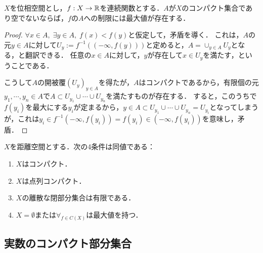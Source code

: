 \documentclass[uplatex,dvipdfmx]{jsreport}
\begin{document}
\begin{proposition}\label{prop-maximum-value-theorem}
    $X$を位相空間とし，$f:X\to\mathbb{R}$を連続関数とする．$A$が$X$のコンパクト集合であり空でないならば，$f$の$A$への制限には最大値が存在する．
\end{proposition}
\begin{proof}
    $\forall x\in A,\;\exists y\in A,\; f(x)<f(y)$と仮定して，矛盾を導く．
    これは，$A$の元$y\in A$に対して$U_y:=f^{-1}((-\infty,f(y)))$と定めると，$A=\cup_{y\in A}U_y$となる，と翻訳できる．
    任意の$x\in A$に対して，$y$が存在して$x\in U_y$を満たす，ということである．

    こうして$A$の開被覆$(U_y)_{y\in A}$を得たが，$A$はコンパクトであるから，有限個の元$y_1,\cdots,y_n\in A$で$A\subset U_{y_1}\cup\cdots\cup U_{y_n}$を満たすものが存在する．
    すると，このうちで$f(y_i)$を最大にする$y_i$が定まるから，$y\in A\subset U_{y_1}\cup\cdots\cup U_{y_n}=U_{y_i}$となってしまうが，これは$y_i\in f^{-1}(-\infty,f(y_i))=f(y_i)\in(-\infty,f(y_i))$を意味し，矛盾．
\end{proof}

\begin{proposition}
    $X$を距離空間とする．次の4条件は同値である：
    \begin{enumerate}
        \item $X$はコンパクト．
        \item $X$は点列コンパクト．
        \item $X$の離散な閉部分集合は有限である．
        \item $X=\emptyset$または$\forall_{f\in C(X)}$は最大値を持つ．
    \end{enumerate}
\end{proposition}

\subsection{実数のコンパクト部分集合}
\end{document}
